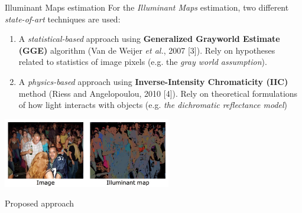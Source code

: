 \begin{tframe}{Illuminant Maps estimation}
\vspace{0.2cm}
For the \emph{Illuminant Maps} estimation, two different \emph{state-of-art} techniques are used: 
\vspace{0.3cm}
\begin{small}
\begin{enumerate}
\item A \emph{statistical-based} approach using \textbf{Generalized Grayworld Estimate (GGE)} algorithm {\tiny (Van de Weijer \emph{et al.}, 2007 [3])}. Rely on hypotheses related to statistics of image pixels (e.g.  the \emph{gray world assumption}).
\vspace{0.2cm}
\item A \emph{physics-based} approach using \textbf{Inverse-Intensity Chromaticity (IIC)} method {\tiny (Riess and Angelopoulou, 2010 [4])}. Rely on theoretical formulations of how light interacts with objects (e.g. \emph{the dichromatic reflectance model})
\end{enumerate}
\end{small}

\begin{center}
\includegraphics[width=0.55\textwidth]{images/riess.jpg}
\end{center}

\end{tframe}

\begin{tframe}{Proposed approach}
\end{tframe}

